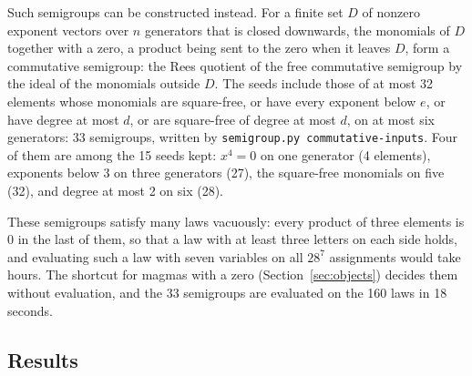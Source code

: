 \documentclass[11pt,a4paper]{article}
\theoremstyle{definition}
\theoremstyle{remark}
\newcommand{\code}[1]{\texttt{#1}}
\begin{document}
Such semigroups can be constructed instead. For a finite set $D$ of nonzero exponent vectors over $n$ generators that is closed downwards, the monomials of $D$ together with a zero, a product being sent to the zero when it leaves $D$, form a commutative semigroup: the Rees quotient of the free commutative semigroup by the ideal of the monomials outside $D$. The seeds include those of at most 32 elements whose monomials are square-free, or have every exponent below $e$, or have degree at most $d$, or are square-free of degree at most $d$, on at most six generators: 33 semigroups, written by \code{semigroup.py commutative-inputs}. Four of them are among the 15 seeds kept: $x^4 = 0$ on one generator (4 elements), exponents below 3 on three generators (27), the square-free monomials on five (32), and degree at most 2 on six (28).

These semigroups satisfy many laws vacuously: every product of three elements is $0$ in the last of them, so that a law with at least three letters on each side holds, and evaluating such a law with seven variables on all $28^7$ assignments would take hours. The shortcut for magmas with a zero (Section~\ref{sec:objects}) decides them without evaluation, and the 33 semigroups are evaluated on the 160 laws in 18 seconds.

\subsection{Results}
\end{document}
